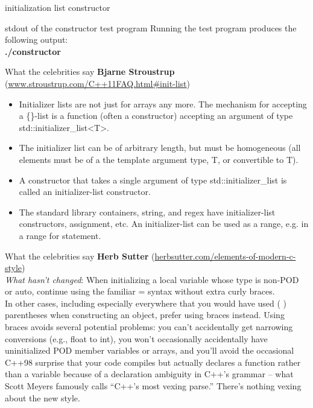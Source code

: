 \documentclass[11pt]{beamer}
\begin{document}
\begin{frame}{initialization list constructor}

\end{frame}

\begin{frame}{stdout of the constructor test program}
Running the test program produces the following output:
\\[0.4cm]
\textbf{./constructor}
\pause

\end{frame}

\begin{frame}{What the celebrities say}
\textbf{Bjarne Stroustrup} (\href{http://www.stroustrup.com/C++11FAQ.html\#init-list}{www.stroustrup.com/C++11FAQ.html\#init-list})
\begin{itemize}
\item Initializer lists are not just for arrays any more. The mechanism for accepting a \{\}-list is a function (often a constructor) accepting an argument of type std::initializer\_list\textless T\textgreater .\\
\pause
\item The initializer list can be of arbitrary length, but must be homogeneous (all elements must be of a the template argument type, T, or convertible to T).\\
\pause
\item A constructor that takes a single argument of type std::initializer\_list is called an initializer-list constructor.\\
\pause
\item The standard library containers, string, and regex have initializer-list constructors, assignment, etc. An initializer-list can be used as a range, e.g. in a range for statement.
\end{itemize}
\end{frame}

\begin{frame}{What the celebrities say}
\textbf{Herb Sutter} (\href{http://herbsutter.com/elements-of-modern-c-style}{herbsutter.com/elements-of-modern-c-style})\\

\emph{What hasn’t changed}: When initializing a local variable whose type is non-POD or auto, continue using the familiar = syntax without extra curly braces.\\
\pause
In other cases, including especially everywhere that you would have used ( ) parentheses when constructing an object, prefer using { } braces instead. Using braces avoids several potential problems: you can’t accidentally get narrowing conversions (e.g., float to int), you won’t occasionally accidentally have uninitialized POD member variables or arrays, and you’ll avoid the occasional C++98 surprise that your code compiles but actually declares a function rather than a variable because of a declaration ambiguity in C++’s grammar – what Scott Meyers famously calls “C++’s most vexing parse.” There’s nothing vexing about the new style.
\end{frame}
\end{document}
